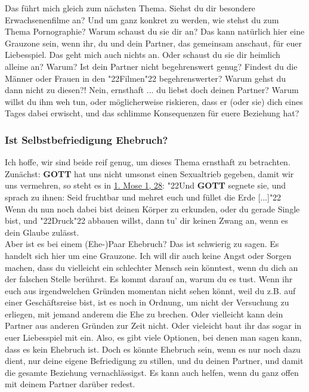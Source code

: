 \documentclass[10pt,a5paper]{article}
\newcommand{\Gott}[0]{\textbf{GOTT}}
\newcommand{\q}[1]{\char"22{#1}\char"22 }
\begin{document}
		Das f\"uhrt mich gleich zum n\"achsten Thema.
		Siehst du dir besondere Erwachsenenfilme an?
		Und um ganz konkret zu werden,
		wie stehst du zum Thema Pornographie?
		Warum schaust du sie dir an?
		Das kann nat\"urlich hier eine Grauzone sein,
		wenn ihr,
		du und dein Partner,
		das gemeinsam anschaut,
		f\"ur euer Liebesspiel.
		Das geht mich auch nichts an.
		Oder schaust du sie dir heimlich alleine an?
		Warum?
		Ist dein Partner nicht begehrenswert genug?
		Findest du die M\"anner oder Frauen in den \q{Filmen} begehrenswerter?
		Warum gehst du dann nicht zu diesen?!
		Nein,
		ernsthaft ...
		du liebst doch deinen Partner?
		Warum willst du ihm weh tun,
		oder m\"oglicherweise riskieren,
		dass er (oder sie) dich eines Tages dabei erwischt,
		und das schlimme Konsequenzen f\"ur euere Beziehung hat?
						
	\subsubsection{Ist Selbstbefriedigung Ehebruch?}
		Ich hoffe,
		wir sind beide reif genug,
		um dieses Thema ernsthaft zu betrachten.
		Zun\"achst: {\Gott} hat uns nicht umsonst einen Sexualtrieb gegeben,
		damit wir uns vermehren,
		so steht es in \href{https://www.die-bibel.de/bibeln/online-bibeln/lesen/LU17/GEN.1/1.-Mose-1}{1. Mose 1, 28}:
		\q{Und {\Gott} segnete sie,
		und sprach zu ihnen:
		Seid fruchtbar und mehret euch und füllet die Erde [...]}
		\\
		Wenn du nun noch dabei bist deinen K\"orper zu erkunden,
		oder du gerade Single bist,
		und \q{Druck} abbauen willst,
		dann tu' dir keinen Zwang an,
		wenn es dein Glaube zul\"asst.
		\\
		Aber ist es bei einem (Ehe-)Paar Ehebruch?
		Das ist schwierig zu sagen.
		Es handelt sich hier um eine Grauzone.
		Ich will dir auch keine Angst oder Sorgen machen,
		dass du vielleicht ein schlechter Mensch sein k\"onntest,
		wenn du dich an der falschen Stelle ber\"uhrst.
		Es kommt darauf an,
		warum du es tust.
		Wenn ihr euch aus irgendwelchen Gr\"unden momentan nicht sehen k\"onnt,
		weil du z.B. auf einer Gesch\"aftsreise bist,
		ist es noch in Ordnung,
		um nicht der Versuchung zu erliegen,
		mit jemand anderem die Ehe zu brechen.
		Oder vielleicht kann dein Partner aus anderen Gr\"unden zur Zeit nicht.
		Oder vieleicht baut ihr das sogar in euer Liebesspiel mit ein.
		Also,
		es gibt viele Optionen,
		bei denen man sagen kann,
		dass es kein Ehebruch ist.
		Doch es k\"onnte Ehebruch sein,
		wenn es nur noch dazu dient,
		nur deine eigene Befriedigung zu stillen,
		und du deinen Partner,
		und damit die gesamte Beziehung vernachl\"assigst.
		Es kann auch helfen,
		wenn du ganz offen mit deinem Partner dar\"uber redest.
		
\end{document}
